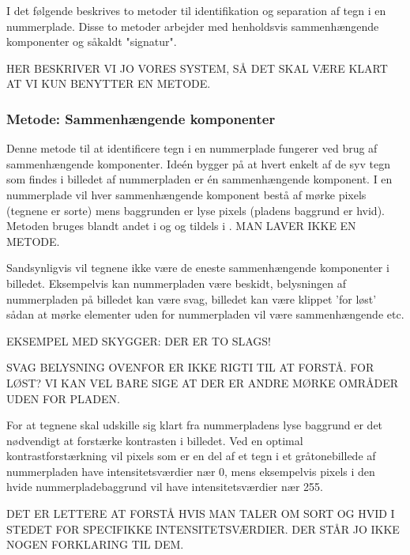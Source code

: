 

I det følgende beskrives to metoder til identifikation og separation af tegn i en nummerplade. Disse to metoder arbejder med henholdsvis sammenhængende komponenter og såkaldt "signatur".

HER BESKRIVER VI JO VORES SYSTEM, SÅ DET SKAL VÆRE KLART AT VI KUN BENYTTER EN METODE.
\subsubsection*{Metode: Sammenhængende komponenter}
Denne metode til at identificere tegn i en nummerplade fungerer ved brug af sammenhængende komponenter. Ideén bygger på at hvert enkelt af de syv tegn som findes i billedet af nummerpladen er én sammenhængende komponent. I en nummerplade vil hver sammenhængende komponent bestå af mørke pixels (tegnene er sorte) mens baggrunden er lyse pixels (pladens baggrund er hvid). Metoden bruges blandt andet i \cite{nijhuis} og \cite{parker} og tildels i \cite{kwas}.
MAN LAVER IKKE EN METODE.

Sandsynligvis vil tegnene ikke være de eneste sammenhængende komponenter i billedet. Eksempelvis kan nummerpladen være beskidt, belysningen af nummerpladen på billedet kan være svag, billedet kan være klippet 'for løst' sådan at mørke elementer uden for nummerpladen vil være sammenhængende etc.

EKSEMPEL MED SKYGGER: DER ER TO SLAGS!

SVAG BELYSNING OVENFOR ER IKKE RIGTI TIL AT FORSTÅ. FOR LØST? VI KAN VEL BARE SIGE AT DER ER ANDRE MØRKE OMRÅDER UDEN FOR PLADEN.

For at tegnene skal udskille sig klart fra nummerpladens lyse baggrund er det nødvendigt at forstærke kontrasten i billedet. Ved en optimal kontrastforstærkning vil pixels som er en del af et tegn i et gråtonebillede af nummerpladen have intensitetsværdier nær 0, mens eksempelvis pixels i den hvide nummerpladebaggrund vil have intensitetsværdier nær 255.

DET ER LETTERE AT FORSTÅ HVIS MAN TALER OM SORT OG HVID I STEDET FOR SPECIFIKKE INTENSITETSVÆRDIER. DER STÅR JO IKKE NOGEN FORKLARING TIL DEM.


